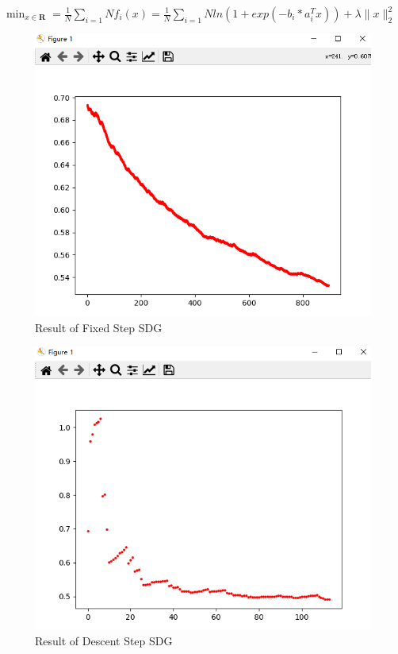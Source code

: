 \documentclass{xjtureport}
\begin{document}
$\mathop{\min}_{x\in \textbf{R}} = \frac{1}{N} \sum_{i=1}{N} f_{i}(x) = \frac{1}{N} \sum_{i =1}{N} ln(1+exp(-b_{i}*a_{i}^{T}x)) + \lambda \| x\|_{2}^{2}$

\begin{figure}[H]
    \centering
    \includegraphics[scale = 0.4]{Fixed Step SDG.png}
    \caption{Result of Fixed Step SDG}
    \end{figure}
\begin{figure}[H]
    \centering
    \includegraphics[scale = 0.4]{Descent Step SDG.png}
    \caption{Result of Descent Step SDG}
    \end{figure}
\end{document}
